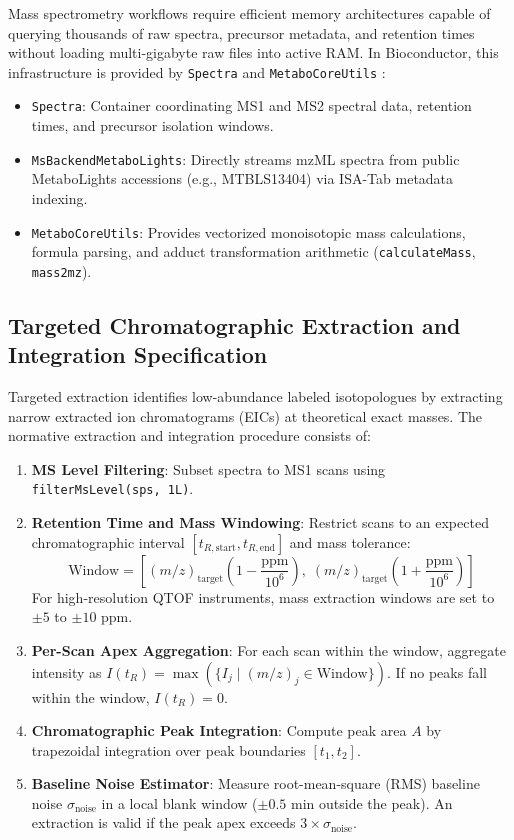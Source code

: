 \documentclass[11pt,twoside,openright]{book}
\begin{document}
Mass spectrometry workflows require efficient memory architectures capable of querying thousands of raw spectra, precursor metadata, and retention times without loading multi-gigabyte raw files into active RAM. In Bioconductor, this infrastructure is provided by \texttt{Spectra} and \texttt{MetaboCoreUtils} \cite{rainer2022modular}:
\begin{itemize}
    \item \texttt{Spectra}: Container coordinating MS1 and MS2 spectral data, retention times, and precursor isolation windows.
    \item \texttt{MsBackendMetaboLights}: Directly streams mzML spectra from public MetaboLights accessions (e.g., MTBLS13404) via ISA-Tab metadata indexing.
    \item \texttt{MetaboCoreUtils}: Provides vectorized monoisotopic mass calculations, formula parsing, and adduct transformation arithmetic (\texttt{calculateMass}, \texttt{mass2mz}).
\end{itemize}

\subsection{Targeted Chromatographic Extraction and Integration Specification}

Targeted extraction identifies low-abundance labeled isotopologues by extracting narrow extracted ion chromatograms (EICs) at theoretical exact masses. The normative extraction and integration procedure consists of:
\begin{enumerate}
    \item \textbf{MS Level Filtering}: Subset spectra to MS1 scans using \texttt{filterMsLevel(sps, 1L)}.
    \item \textbf{Retention Time and Mass Windowing}: Restrict scans to an expected chromatographic interval $[t_{R,\text{start}}, t_{R,\text{end}}]$ and mass tolerance:
    \begin{equation}
    \text{Window} = \left[ (m/z)_{\text{target}} \left(1 - \frac{\text{ppm}}{10^6}\right), \; (m/z)_{\text{target}} \left(1 + \frac{\text{ppm}}{10^6}\right) \right]
    \label{eq:ppm_window}
    \end{equation}
    For high-resolution QTOF instruments, mass extraction windows are set to $\pm 5$ to $\pm 10$ ppm.
    \item \textbf{Per-Scan Apex Aggregation}: For each scan within the window, aggregate intensity as $I(t_R) = \max(\{I_j \mid (m/z)_j \in \text{Window}\})$. If no peaks fall within the window, $I(t_R) = 0$.
    \item \textbf{Chromatographic Peak Integration}: Compute peak area $A$ by trapezoidal integration over peak boundaries $[t_1, t_2]$.
    \item \textbf{Baseline Noise Estimator}: Measure root-mean-square (RMS) baseline noise $\sigma_{\text{noise}}$ in a local blank window ($\pm 0.5$ min outside the peak). An extraction is valid if the peak apex exceeds $3 \times \sigma_{\text{noise}}$.
\end{enumerate}
\end{document}
